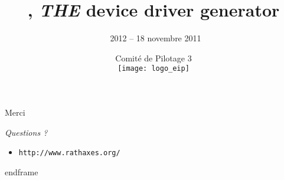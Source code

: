 \documentclass{beamer}
\title{\rtx, \emph{THE} device driver generator}
\date[Comité de Pilotage 3]{Comité de Pilotage 3 \\ \vspace{10pt} \texttt{[image: logo\_eip]}}
\author[\rtx\ 2012 -- 18 novembre 2011]{\rtx\ 2012 -- 18 novembre 2011 \vspace{-20pt}}
\begin{document}
\begin{frame}
\titlepage
\end{frame}

\begin{frame}{Merci}
\begin{center}
\Huge{\emph{Questions ?}}
\end{center}

\vspace{2em}
\begin{itemize}
\item \Large{\texttt{http://www.rathaxes.org/}}
\end{itemize}
\end{frame}
end{frame}
\end{document}
